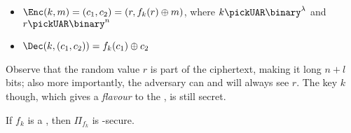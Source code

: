 \begin{itemize}
    \item $\Enc(k, m) = (c_1, c_2) = (r, f_k(r) \xor m)$, where $k \pickUAR \binary^\lambda$ and $r \pickUAR \binary^n$
    
    \item $\Dec(k, (c_1, c_2)) = f_k(c_1) \xor c_2$
\end{itemize}

Observe that the random value $r$ is part of the ciphertext, making it long $n+l$ bits; also more importantly, the adversary can and will always see $r$. The key $k$ though, which gives a \textit{flavour} to the \prf, is still secret.

\begin{theorem} \label{thm:prfcpa}
    If $f_k$ is a \prf, then $\Pi_{f_k}$ is \cpa-secure.
\end{theorem}

